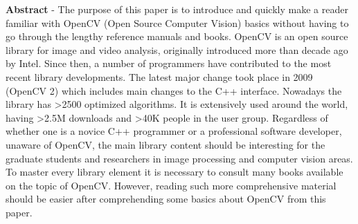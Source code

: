 \textbf{Abstract} - The purpose of this paper is to introduce and quickly make a reader familiar with OpenCV (Open Source Computer Vision) basics without having to go through the lengthy reference manuals and books. OpenCV is an open source library for image and video analysis, originally introduced more than decade ago by Intel. Since then, a number of programmers have contributed to the most recent library developments. The latest major change took place in 2009 (OpenCV 2) which includes main changes to the C++ interface. Nowadays the library has >2500 optimized algorithms. It is extensively used around the world, having >2.5M downloads and >40K people in the user group. Regardless of whether one is a novice C++ programmer or a professional software developer, unaware of OpenCV, the main library content should be interesting for the graduate students and researchers in image processing and computer vision areas. To master every library element it is necessary to consult many books available on the topic of OpenCV. However, reading such more comprehensive material should be easier after comprehending some basics about OpenCV from this paper. \par
